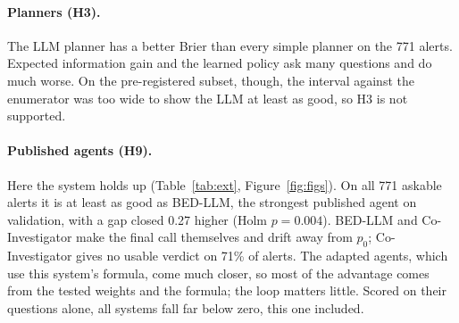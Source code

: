 \documentclass[11pt,a4paper]{article}
\begin{document}
\paragraph{Planners (H3).} The LLM planner has a better Brier than every simple planner on the 771 alerts. Expected information gain and the learned policy ask many questions and do much worse. On the pre-registered subset, though, the interval against the enumerator was too wide to show the LLM at least as good, so H3 is not supported.

\begin{table}[t]
\centering\small
{}
\caption{Published agents against this system on the same 208 askable subset alerts, with the same LLM, rules and budget.}
\label{tab:ext}
\end{table}

\paragraph{Published agents (H9).} Here the system holds up (Table~\ref{tab:ext}, Figure~\ref{fig:figs}). On all 771 askable alerts it is at least as good as BED-LLM, the strongest published agent on validation, with a gap closed 0.27 higher (Holm $p=0.004$). BED-LLM and Co-Investigator make the final call themselves and drift away from $p_0$; Co-Investigator gives no usable verdict on 71\% of alerts. The adapted agents, which use this system's formula, come much closer, so most of the advantage comes from the tested weights and the formula; the loop matters little. Scored on their questions alone, all systems fall far below zero, this one included.
\end{document}
